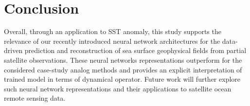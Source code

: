 \documentclass{article}
\begin{document}
\section{Conclusion}
\label{sec:Conc}

Overall, through an application to SST anomaly, this study supports the relevance of our recently introduced neural network architectures \cite{fablet_bilinear_2017} for the data-driven prediction and reconstruction of sea surface geophysical fields from partial satellite observations. These neural networks representations outperform for the considered case-study analog methods and provides an explicit interpretation of trained model in terms of dynamical operator. Future work will further explore such neural network representations and their applications to satellite ocean remote sensing data.








\end{document}
